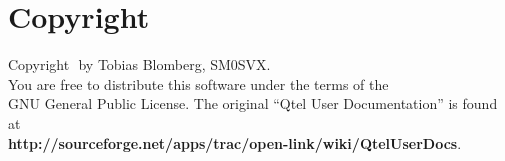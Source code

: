 \documentclass[paper=a4,fontsize=12pt]{scrartcl}
\begin{document}
\section{Copyright}
   Copyright \textcopyright \,\,by Tobias Blomberg, SM0SVX.\\
   You are free to distribute this software under the terms of the\\
   GNU General Public License. The original ``Qtel User Documentation'' is found at\\
   \textbf{http://sourceforge.net/apps/trac/open-link/wiki/QtelUserDocs}.\\
\end{document}
